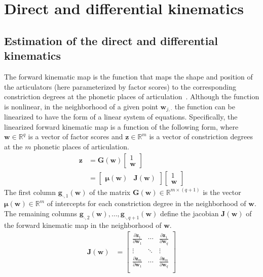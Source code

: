 \documentclass[preprint]{JASAnew}\usepackage[]{graphicx}\usepackage[]{color}
\begin{document}
\section{Direct and differential kinematics}
\label{sec:forwardkinematicmap}

\subsection{Estimation of the direct and differential kinematics}

The forward kinematic map is the function that maps the shape and position of the articulators (here parameterized by factor scores) to the corresponding constriction degrees at the phonetic places of articulation~\citep{lammert2013statistical}. 
%
Although the function is nonlinear, in the neighborhood of a given point $\mathbf{w}_{j,\cdot}$ the function can be linearized to have the form of a linear system of equations.
%
Specifically, the linearized forward kinematic map is a function of the following form, where $\mathbf{w} \in \mathbb{R}^q$ is a vector of factor scores and $\mathbf{z} \in \mathbb{R}^{m}$ is a vector of constriction degrees at the $m$ phonetic places of articulation.
%
\begin{align}
\mathbf{z} 
&= 
\mathbf{G}\left( \mathbf{w} \right) 
\left[ \begin{array}{c} 1 \\ \mathbf{w} \end{array} \right] \\
&= 
\left[ \begin{array}{cc} 
\boldsymbol{\mu}\left(\mathbf{w}\right) & \mathbf{J}\left(\mathbf{w}\right) 
\end{array} \right]
\left[ \begin{array}{c} 1 \\ \mathbf{w} \end{array} \right]
\end{align}
%
The first column $\mathbf{g}_{\cdot,1}(\mathbf{w})$ of the matrix $\mathbf{G}(\mathbf{w}) \in \mathbb{R}^{m\times (q+1)}$ is the vector $\boldsymbol{\mu}(\mathbf{w}) \in \mathbb{R}^m$ of intercepts for each constriction degree in the neighborhood of $\mathbf{w}$. 
%
The remaining columns $\mathbf{g}_{\cdot,2}(\mathbf{w}), \ldots, \mathbf{g}_{\cdot,q+1}(\mathbf{w})$ define the jacobian $\mathbf{J}(\mathbf{w})$ of the forward kinematic map in the neighborhood of $\mathbf{w}$. 
% 
\begin{align}
\mathbf{J}(\mathbf{w}) 
&=
\left[ \begin{array}{ccc} 
\frac{\partial \mathbf{z}_1}{\partial \mathbf{w}_1} & \cdots & \frac{\partial \mathbf{z}_1}{\partial \mathbf{w}_q} \\
\vdots & \ddots & \vdots \\
\frac{\partial \mathbf{z}_m}{\partial \mathbf{w}_1} & \cdots & \frac{\partial \mathbf{z}_m}{\partial \mathbf{w}_q} \\
\end{array} \right]
\end{align}
\end{document}
